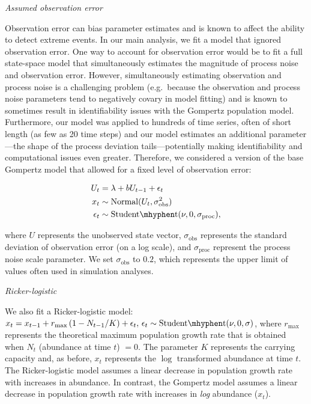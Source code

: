 \emph{Assumed observation error}

Observation error can bias parameter estimates\cite{knape2012} and is known to affect the ability to detect extreme events\cite{ward2007}. In our main analysis, we fit a model that ignored observation error. One way to account for observation error would be to fit a full state-space model that simultaneously estimates the magnitude of process noise and observation error. However, simultaneously estimating observation and process noise is a challenging problem (e.g.\ because the observation and process noise parameters tend to negatively covary in model fitting) and is known to sometimes result in identifiability issues with the Gompertz population model\cite{knape2008}. Furthermore, our model was applied to hundreds of time series, often of short length (as few as 20 time steps) and our model estimates an additional parameter---the shape of the process deviation tails---potentially making identifiability and computational issues even greater. Therefore, we considered a version of the base Gompertz model that allowed for a fixed level of observation error:

\begin{align*}
U_t &= \lambda + b U_{t-1} + \epsilon_t\\
x_t &\sim \mathrm{Normal}(U_t, \sigma_\mathrm{obs}^2)\\
\epsilon_t &\sim \mathrm{Student\mhyphen t}(\nu, 0, \sigma_\mathrm{proc}),
\end{align*}

where \(U\) represents the unobserved state vector, \(\sigma_\mathrm{obs}\) represents the standard deviation of observation error (on a log scale), and \(\sigma_\mathrm{proc}\) represent the process noise scale parameter. We set \(\sigma_\mathrm{obs}\) to \(0.2\), which represents the upper limit of values often used in simulation analyses\cite{valpine2002, thorson2014b}.

\emph{Ricker-logistic}

We also fit a Ricker-logistic model: \(x_t = x_{t-1} + r_{\mathrm{max}}\left(1 - N_{t-1}/K\right) + \epsilon_t,\, \epsilon_t \sim \mathrm{Student\mhyphen t}(\nu, 0, \sigma)\), where \(r_\mathrm{max}\) represents the theoretical maximum population growth rate that is obtained when \(N_t\) (abundance at time \(t\)) \(= 0\). The parameter \(K\) represents the carrying capacity and, as before, \(x_t\) represents the \(\log\) transformed abundance at time \(t\). The Ricker-logistic model assumes a linear decrease in population growth rate with increases in abundance. In contrast, the Gompertz model assumes a linear decrease in population growth rate with increases in \textit{log} abundance (\(x_t\))\cite{thibaut2012}.

